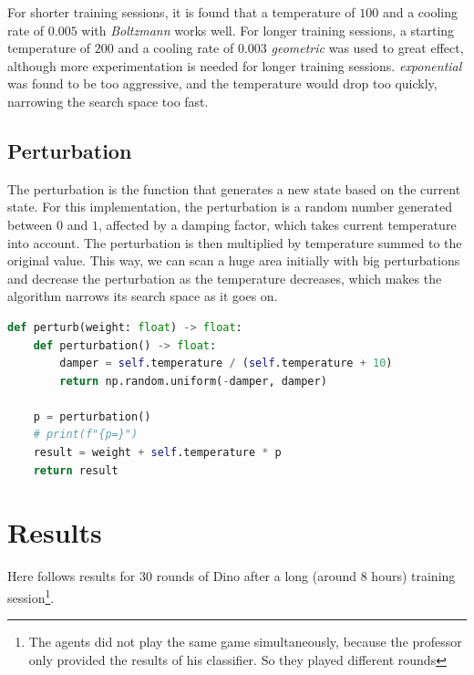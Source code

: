 \documentclass[review]{elsarticle}
\begin{document}
For shorter training sessions, it is found that a temperature of $100$ and a cooling rate of $0.005$ with \textit{Boltzmann} works well. For longer training sessions, a starting temperature of $200$ and a cooling rate of $0.003$ \textit{geometric} was used to great effect, although more experimentation is needed for longer training sessions. \textit{exponential} was found to be too aggressive, and the temperature would drop too quickly, narrowing the search space too fast.

\subsection{Perturbation}

The perturbation is the function that generates a new state based on the current state. For this implementation, the perturbation is a random number generated between $0$ and $1$, affected by a damping factor, which takes current temperature into account. The perturbation is then multiplied by temperature summed to the original value. This way, we can scan a huge area initially with big perturbations and decrease the perturbation as the temperature decreases, which makes the algorithm narrows its search space as it goes on.

\begin{lstlisting}[language=Python]
def perturb(weight: float) -> float:
    def perturbation() -> float:
        damper = self.temperature / (self.temperature + 10)
        return np.random.uniform(-damper, damper)

    p = perturbation()
    # print(f"{p=}")
    result = weight + self.temperature * p
    return result
\end{lstlisting}

\section{Results}

Here follows results for $30$ rounds of Dino after a long (around $8$ hours) training session\footnote{The agents did not play the same game simultaneously, because the professor only provided the results of his classifier. So they played different rounds}.

\end{document}
